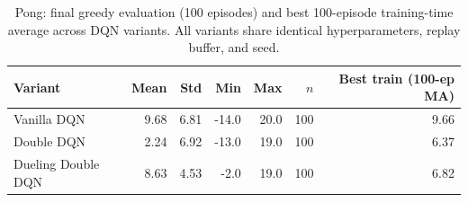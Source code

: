 \begin{table}[h]\centering\small
\caption{Pong: final greedy evaluation (100 episodes) and best 100-episode training-time average across DQN variants. All variants share identical hyperparameters, replay buffer, and seed.}
\label{tab:pong_final}
\begin{tabular}{lrrrrrr}
\toprule
Variant & Mean & Std & Min & Max & $n$ & Best train (100-ep MA) \\
\midrule
Vanilla DQN & 9.68 & 6.81 & -14.0 & 20.0 & 100 & 9.66 \\
Double DQN & 2.24 & 6.92 & -13.0 & 19.0 & 100 & 6.37 \\
Dueling Double DQN & 8.63 & 4.53 & -2.0 & 19.0 & 100 & 6.82 \\
\bottomrule
\end{tabular}
\end{table}
